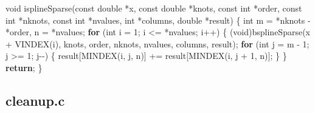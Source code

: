 \documentclass[
  12pt,
  letterpaper,
  DIV=11,
  numbers=noendperiod]{scrreprt}
\newenvironment{Shaded}{\begin{snugshade}}{\end{snugshade}}
\newcommand{\ControlFlowTok}[1]{\textcolor[rgb]{0.00,0.23,0.31}{\textbf{#1}}}
\newcommand{\DataTypeTok}[1]{\textcolor[rgb]{0.68,0.00,0.00}{#1}}
\newcommand{\DecValTok}[1]{\textcolor[rgb]{0.68,0.00,0.00}{#1}}
\newcommand{\NormalTok}[1]{\textcolor[rgb]{0.00,0.23,0.31}{#1}}
\newcommand{\OperatorTok}[1]{\textcolor[rgb]{0.37,0.37,0.37}{#1}}
\theoremstyle{remark}
\begin{document}
\begin{Shaded}
\begin{Highlighting}[]
\DataTypeTok{void}\NormalTok{ isplineSparse}\OperatorTok{(}\DataTypeTok{const} \DataTypeTok{double} \OperatorTok{*}\NormalTok{x}\OperatorTok{,} \DataTypeTok{const} \DataTypeTok{double} \OperatorTok{*}\NormalTok{knots}\OperatorTok{,} \DataTypeTok{const} \DataTypeTok{int} \OperatorTok{*}\NormalTok{order}\OperatorTok{,}
                   \DataTypeTok{const} \DataTypeTok{int} \OperatorTok{*}\NormalTok{nknots}\OperatorTok{,} \DataTypeTok{const} \DataTypeTok{int} \OperatorTok{*}\NormalTok{nvalues}\OperatorTok{,} \DataTypeTok{int} \OperatorTok{*}\NormalTok{columns}\OperatorTok{,}
                   \DataTypeTok{double} \OperatorTok{*}\NormalTok{result}\OperatorTok{)} \OperatorTok{\{}
    \DataTypeTok{int}\NormalTok{ m }\OperatorTok{=} \OperatorTok{*}\NormalTok{nknots }\OperatorTok{{-}} \OperatorTok{*}\NormalTok{order}\OperatorTok{,}\NormalTok{ n }\OperatorTok{=} \OperatorTok{*}\NormalTok{nvalues}\OperatorTok{;}
    \ControlFlowTok{for} \OperatorTok{(}\DataTypeTok{int}\NormalTok{ i }\OperatorTok{=} \DecValTok{1}\OperatorTok{;}\NormalTok{ i }\OperatorTok{\textless{}=} \OperatorTok{*}\NormalTok{nvalues}\OperatorTok{;}\NormalTok{ i}\OperatorTok{++)} \OperatorTok{\{}
        \OperatorTok{(}\DataTypeTok{void}\OperatorTok{)}\NormalTok{bsplineSparse}\OperatorTok{(}\NormalTok{x }\OperatorTok{+}\NormalTok{ VINDEX}\OperatorTok{(}\NormalTok{i}\OperatorTok{),}\NormalTok{ knots}\OperatorTok{,}\NormalTok{ order}\OperatorTok{,}\NormalTok{ nknots}\OperatorTok{,}\NormalTok{ nvalues}\OperatorTok{,}
\NormalTok{                            columns}\OperatorTok{,}\NormalTok{ result}\OperatorTok{);}
        \ControlFlowTok{for} \OperatorTok{(}\DataTypeTok{int}\NormalTok{ j }\OperatorTok{=}\NormalTok{ m }\OperatorTok{{-}} \DecValTok{1}\OperatorTok{;}\NormalTok{ j }\OperatorTok{\textgreater{}=} \DecValTok{1}\OperatorTok{;}\NormalTok{ j}\OperatorTok{{-}{-})} \OperatorTok{\{}
\NormalTok{            result}\OperatorTok{[}\NormalTok{MINDEX}\OperatorTok{(}\NormalTok{i}\OperatorTok{,}\NormalTok{ j}\OperatorTok{,}\NormalTok{ n}\OperatorTok{)]} \OperatorTok{+=}\NormalTok{ result}\OperatorTok{[}\NormalTok{MINDEX}\OperatorTok{(}\NormalTok{i}\OperatorTok{,}\NormalTok{ j }\OperatorTok{+} \DecValTok{1}\OperatorTok{,}\NormalTok{ n}\OperatorTok{)];}
        \OperatorTok{\}}
    \OperatorTok{\}}
    \ControlFlowTok{return}\OperatorTok{;}
\OperatorTok{\}}
\end{Highlighting}
\end{Shaded}

\subsection*{cleanup.c}\label{cleanup.c}
\end{document}

